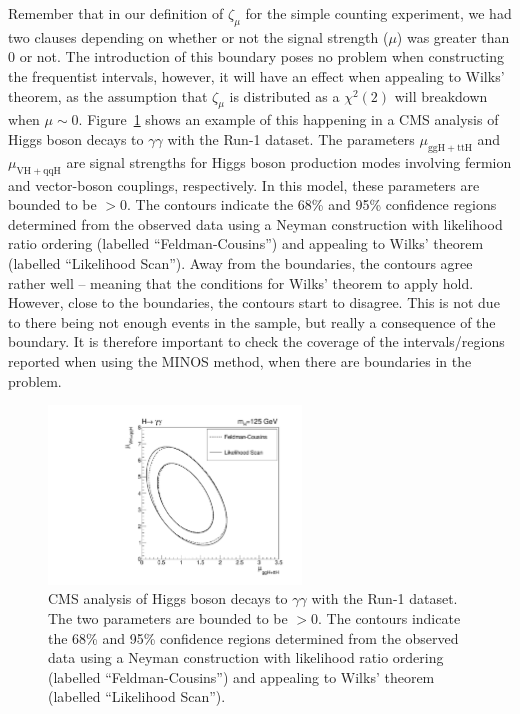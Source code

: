 Remember that in our definition of $\zeta_{\mu}$ for the simple counting experiment, we had two clauses depending on whether or not the signal strength ($\mu$) was greater than 0 or not. The introduction of this boundary poses no problem when constructing the frequentist intervals, however, it will have an effect when appealing to Wilks' theorem, as the assumption that $\zeta_{\mu}$ is distributed as a $\chi^{2}(2)$ will breakdown when $\mu\sim 0$. Figure~\ref{fig:example_fc} shows an example of this happening in a CMS analysis of Higgs boson decays to $\gamma\gamma$ with the Run-1 dataset. The parameters $\mu_{\mathrm{ggH+ttH}}$ and  $\mu_{\mathrm{VH+qqH}}$ are signal strengths for Higgs boson production modes involving fermion and vector-boson couplings, respectively. In this model, these parameters are bounded to be $>0$. The contours indicate the 68\% and 95\% confidence regions determined from the observed data using a Neyman construction with likelihood ratio ordering (labelled ``Feldman-Cousins'') and appealing to Wilks' theorem (labelled ``Likelihood Scan''). Away from the boundaries, the contours agree rather well -- meaning that the conditions for Wilks' theorem to apply hold. However, close to the boundaries, the contours start to disagree. This is not due to there being not enough events in the sample, but really a consequence of the boundary. It is therefore important to check the coverage of the intervals/regions reported when using the \textsf{MINOS} method, when there are boundaries in the problem. 
\begin{figure}[hbt!]
    \centering
    \includegraphics[width=0.6\textwidth]{figures/Intervals/compare-fc-lh.pdf}
    \caption{CMS analysis of Higgs boson decays to $\gamma\gamma$ with the Run-1 dataset. The two parameters are bounded to be $>0$. The contours indicate the 68\% and 95\% confidence regions determined from the observed data using a Neyman construction with likelihood ratio ordering (labelled ``Feldman-Cousins'') and appealing to Wilks' theorem (labelled ``Likelihood Scan'').}
    \label{fig:example_fc}
\end{figure}

